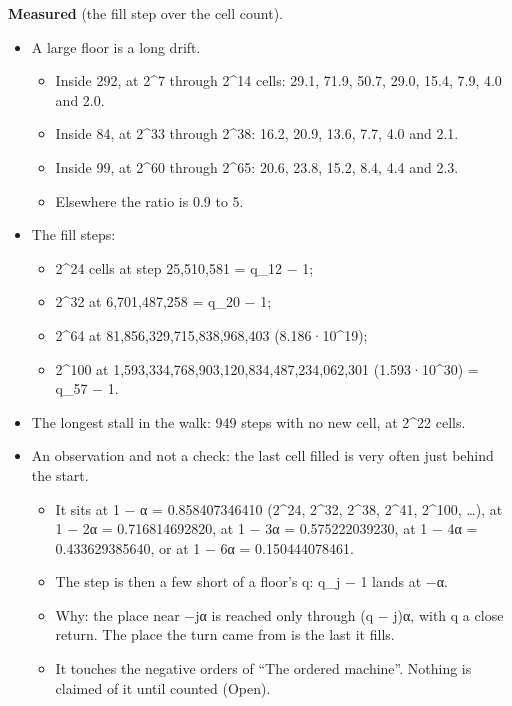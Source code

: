 \textbf{Measured} (the fill step over the cell count).

\begin{itemize}
\item A large floor is a long drift.

\begin{itemize}
\item Inside 292, at 2\textasciicircum{}7 through 2\textasciicircum{}14 cells: 29.1, 71.9, 50.7, 29.0, 15.4, 7.9, 4.0 and 2.0.
\item Inside 84, at 2\textasciicircum{}33 through 2\textasciicircum{}38: 16.2, 20.9, 13.6, 7.7, 4.0 and 2.1.
\item Inside 99, at 2\textasciicircum{}60 through 2\textasciicircum{}65: 20.6, 23.8, 15.2, 8.4, 4.4 and 2.3.
\item Elsewhere the ratio is 0.9 to 5.
\end{itemize}
\item The fill steps:

\begin{itemize}
\item 2\textasciicircum{}24 cells at step 25,510,581 = q\_\allowbreak{}12 − 1;
\item 2\textasciicircum{}32 at 6,701,487,258 = q\_\allowbreak{}20 − 1;
\item 2\textasciicircum{}64 at 81,856,329,715,838,968,403 (8.186·10\textasciicircum{}19);
\item 2\textasciicircum{}100 at 1,593,334,768,903,120,834,487,234,062,301 (1.593·10\textasciicircum{}30) = q\_\allowbreak{}57 − 1.
\end{itemize}
\item The longest stall in the walk: 949 steps with no new cell, at 2\textasciicircum{}22 cells.
\item An observation and not a check: the last cell filled is very often just behind the start.

\begin{itemize}
\item It sits at 1 − α = 0.858407346410 (2\textasciicircum{}24, 2\textasciicircum{}32, 2\textasciicircum{}38, 2\textasciicircum{}41, 2\textasciicircum{}100, …), at 1 − 2α = 0.716814692820, at 1 − 3α = 0.575222039230, at 1 − 4α = 0.433629385640, or at 1 − 6α = 0.150444078461.
\item The step is then a few short of a floor's q: q\_\allowbreak{}j − 1 lands at −α.
\item Why: the place near −jα is reached only through (q − j)α, with q a close return. The place the turn came from is the last it fills.
\item It touches the negative orders of “The ordered machine”. Nothing is claimed of it until counted (Open).
\end{itemize}
\end{itemize}

